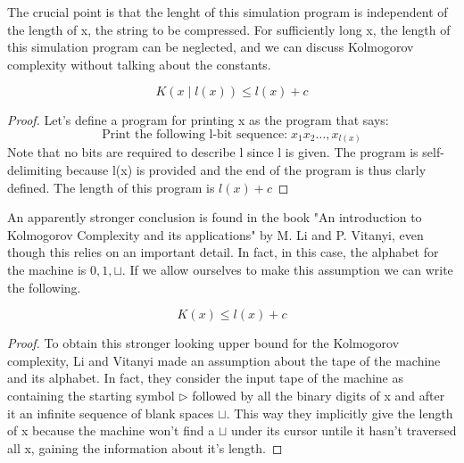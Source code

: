     The crucial point is that the lenght of this simulation program is independent of the length of x, the string to be compressed. For sufficiently long x, the length of this simulation program can be neglected, and we can discuss Kolmogorov complexity without talking about the constants.\\
    \begin{theorem}
        \[ 
            K(x\mid l(x))\leq l(x) +c 
        \]
        \begin{proof}
            Let's define a program for printing x as the program that says:
            \[ 
                \text{Print the following l-bit sequence:}\; x_{1}x_{2}\ldots,x_{l(x)}
            \]
            Note that no bits are required to describe l since l is given. The program is self-delimiting because l(x) is provided and the end of the program is thus clarly defined. The length of this program is $ l(x) +c $ 
        \end{proof}
    \end{theorem}
    An apparently stronger conclusion is found in the book "An introduction to Kolmogorov Complexity and its applications" by M. Li and P. Vitanyi, even though this relies on an important detail. In fact, in this case, the alphabet for the machine is ${0,1,\sqcup}$. If we allow ourselves to make this assumption we can write the following.
    \begin{theorem}
        \[ 
            K(x)\leq l(x) +c 
        \]
        \begin{proof}
            To obtain this stronger looking upper bound for the Kolmogorov complexity, Li and Vitanyi made an assumption about the tape of the machine and its alphabet. In fact, they consider the input tape of the machine as containing the starting symbol $\triangleright$ followed by all the binary digits of x and after it an infinite sequence of blank spaces $\sqcup$. This way they implicitly give the length of x because the machine won't find a $\sqcup$ under its cursor untile it hasn't traversed all x, gaining the information about it's length.
        \end{proof}
    \end{theorem}
        

